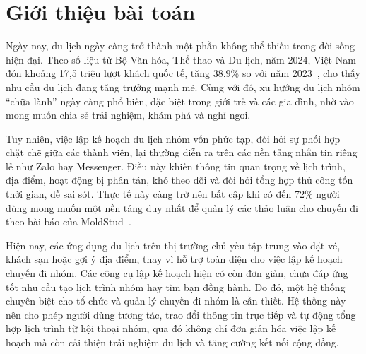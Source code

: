 \section{Giới thiệu bài toán}

Ngày nay, du lịch ngày càng trở thành một phần không thể thiếu trong đời sống hiện đại.
Theo số liệu từ Bộ Văn hóa, Thể thao và Du lịch, năm 2024, Việt Nam đón khoảng 17,5 triệu lượt khách quốc tế, tăng 38.9\% so với năm 2023~\cite{bvhttdl2024}, cho thấy nhu cầu du lịch đang tăng
trưởng mạnh mẽ. Cùng với đó, xu hướng du lịch nhóm ``chữa lành'' ngày càng phổ biến, đặc biệt trong giới trẻ và các gia đình, nhờ vào mong muốn chia sẻ trải nghiệm, khám phá và nghỉ ngơi.

\indent Tuy nhiên, việc lập kế hoạch du lịch nhóm vốn phức tạp, đòi hỏi sự phối hợp chặt chẽ giữa các thành viên, lại thường diễn ra trên các nền tảng nhắn tin riêng lẻ như Zalo hay Messenger. Điều này khiến thông tin quan trọng về lịch trình, địa điểm, hoạt động bị phân tán, khó theo dõi và đòi hỏi tổng hợp thủ công tốn thời gian, dễ sai sót. Thực tế này càng trở nên bất cập khi có đến 72\% người dùng mong muốn một nền tảng duy nhất để quản lý các thảo luận cho chuyến đi theo bài báo của MoldStud~\cite{moldstud_article}. 

\indent Hiện nay, các ứng dụng du lịch trên thị trường chủ yếu tập trung vào đặt vé, khách sạn hoặc gợi ý địa điểm, thay vì hỗ trợ toàn diện cho việc lập kế hoạch chuyến đi nhóm. Các công cụ lập kế hoạch hiện có còn đơn giản, chưa đáp ứng tốt nhu cầu tạo lịch trình nhóm hay tìm bạn đồng hành. Do đó, một hệ thống chuyên biệt cho tổ chức và quản lý chuyến đi nhóm là cần thiết. Hệ thống này nên cho phép người dùng tương tác, trao đổi thông tin trực tiếp và tự động tổng hợp lịch trình từ hội thoại nhóm, qua đó không chỉ đơn giản hóa việc lập kế hoạch mà còn cải thiện trải nghiệm du lịch và tăng cường kết nối cộng đồng.
